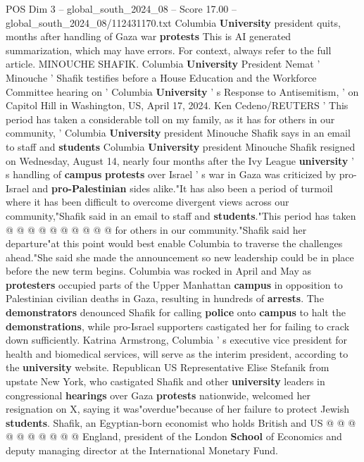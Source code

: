 \begin{textsample}{POS Dim 3 – global\_south\_2024\_08 – Score 17.00 – global\_south\_2024\_08/112431170.txt}  \label{ex:f3_pos_303}
Columbia \textbf{University} president quits, months after handling of Gaza war \textbf{protests} This is AI generated summarization, which may have errors.
For context, always refer to the full article.
MINOUCHE SHAFIK.
Columbia \textbf{University} President Nemat ' Minouche ' Shafik testifies before a House Education and the Workforce Committee hearing on ' Columbia \textbf{University} ' s Response to Antisemitism, ' on Capitol Hill in Washington, US, April 17, 2024.
Ken Cedeno/REUTERS ' This period has taken a considerable toll on my family, as it has for others in our community, ' Columbia \textbf{University} president Minouche Shafik says in an email to staff and \textbf{students} Columbia \textbf{University} president Minouche Shafik resigned on Wednesday, August 14, nearly four months after the Ivy League \textbf{university} ' s handling of \textbf{campus} \textbf{protests} over Israel ' s war in Gaza was criticized by pro-Israel and \textbf{pro-Palestinian} sides alike."It has also been a period of turmoil where it has been difficult to overcome divergent views across our community,"Shafik said in an email to staff and \textbf{students}."This period has taken @ @ @ @ @ @ @ @ @ @ for others in our community."Shafik said her departure"at this point would best enable Columbia to traverse the challenges ahead."She said she made the announcement so new leadership could be in place before the new term begins.
Columbia was rocked in April and May as \textbf{protesters} occupied parts of the Upper Manhattan \textbf{campus} in opposition to Palestinian civilian deaths in Gaza, resulting in hundreds of \textbf{arrests}.
The \textbf{demonstrators} denounced Shafik for calling \textbf{police} onto \textbf{campus} to halt the \textbf{demonstrations}, while pro-Israel supporters castigated her for failing to crack down sufficiently.
Katrina Armstrong, Columbia ' s executive vice president for health and biomedical services, will serve as the interim president, according to the \textbf{university} website.
Republican US Representative Elise Stefanik from upstate New York, who castigated Shafik and other \textbf{university} leaders in congressional \textbf{hearings} over Gaza \textbf{protests} nationwide, welcomed her resignation on X, saying it was"overdue"because of her failure to protect Jewish \textbf{students}.
Shafik, an Egyptian-born economist who holds British and US @ @ @ @ @ @ @ @ @ @ England, president of the London \textbf{School} of Economics and deputy managing director at the International Monetary Fund.

\end{textsample}
